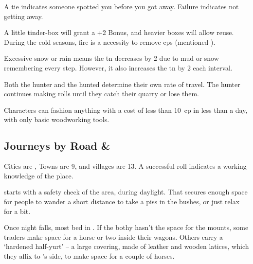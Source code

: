 \begin{multicols}{2}
A tie indicates someone spotted you before you got away.
Failure indicates not getting away.

A little tinder-box will grant a +2 Bonus, and heavier boxes will allow reuse.
During the cold seasons, fire is a necessity to remove \glspl{ep} (mentioned ).

Excessive snow or rain means the \gls{tn} decreases by 2 due to mud or snow remembering every step.
However, it also increases the \gls{tn} by 2 each \gls{interval}.

Both the hunter and the hunted determine their own rate of travel.
The hunter continues making rolls until they catch their quarry or lose them.

Characters can fashion anything with a cost of less than 10~\gls{cp} in less than a day, with only basic woodworking tools.

\subsection{Journeys by Road \& }

Cities are \tn[7], Towns are 9, and \glspl{village} are 13.
A successful roll indicates a working knowledge of the place.

starts with a safety check of the area, during daylight.
That secures enough space for people to wander a short distance to take a piss in the bushes, or just relax for a bit.

Once night falls, most bed in .
If the \gls{bothy} hasn't the space for the mounts, some traders make space for a horse or two inside their wagons.
Others carry a `hardened half-yurt' -- a large covering, made of leather and wooden latices, which they affix to 's side, to make space for a couple of horses.



\end{multicols}
